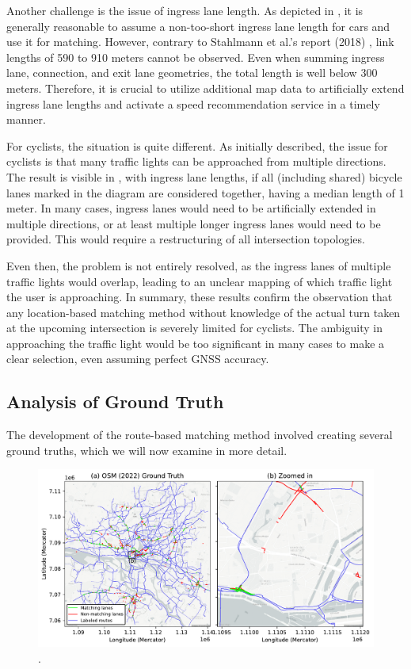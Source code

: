 Another challenge is the issue of ingress lane length. As depicted in , it is generally reasonable to assume a non-too-short ingress lane length for cars and use it for matching. However, contrary to Stahlmann et al.'s report (2018) \cite{stahlmann_exploring_2018}, link lengths of 590 to 910 meters cannot be observed. Even when summing ingress lane, connection, and exit lane geometries, the total length is well below 300 meters. Therefore, it is crucial to utilize additional map data to artificially extend ingress lane lengths and activate a speed recommendation service in a timely manner.

For cyclists, the situation is quite different. As initially described, the issue for cyclists is that many traffic lights can be approached from multiple directions. The result is visible in , with ingress lane lengths, if all (including shared) bicycle lanes marked in the diagram are considered together, having a median length of 1 meter. In many cases, ingress lanes would need to be artificially extended in multiple directions, or at least multiple longer ingress lanes would need to be provided. This would require a restructuring of all intersection topologies.

Even then, the problem is not entirely resolved, as the ingress lanes of multiple traffic lights would overlap, leading to an unclear mapping of which traffic light the user is approaching. In summary, these results confirm the observation that any location-based matching method without knowledge of the actual turn taken at the upcoming intersection is severely limited for cyclists. The ambiguity in approaching the traffic light would be too significant in many cases to make a clear selection, even assuming perfect GNSS accuracy.

\subsection{Analysis of Ground Truth}

The development of the route-based matching method involved creating several ground truths, which we will now examine in more detail.

\begin{figure}[htbp]
\centering 
\includegraphics[width=\linewidth]{images/matching-ground-truth-osm-old.pdf}
\caption{.}
\label{fig:matching-ground-truth-osm-old}
\end{figure}

